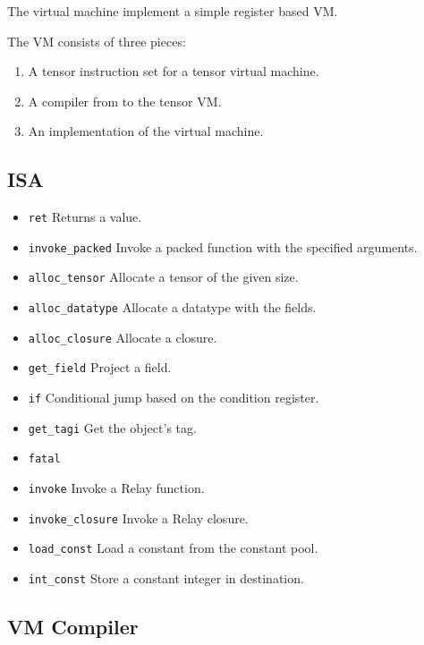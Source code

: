 The \relay virtual machine implement a simple register based VM.

The VM consists of three pieces:
\begin{enumerate}
  \item A tensor instruction set for a tensor virtual machine.
  \item A compiler from \relay to the tensor VM.
  \item An implementation of the virtual machine.
\end{enumerate}

\subsection{ISA}
\begin{itemize}
    \item \verb|ret| Returns a value.
    \item \verb|invoke_packed| Invoke a packed function with the specified arguments.
    \item \verb|alloc_tensor| Allocate a tensor of the given size.
    \item \verb|alloc_datatype| Allocate a datatype with the fields.
    \item \verb|alloc_closure| Allocate a closure.
    \item \verb|get_field| Project a field.
    \item \verb|if| Conditional jump based on the condition register.
    \item \verb|get_tagi| Get the object's tag.
    \item \verb|fatal|
    \item \verb|invoke| Invoke a Relay function.
    \item \verb|invoke_closure| Invoke a Relay closure.
    \item \verb|load_const| Load a constant from the constant pool.
    \item \verb|int_const| Store a constant integer in destination.

\end{itemize}
\subsection{VM Compiler}


